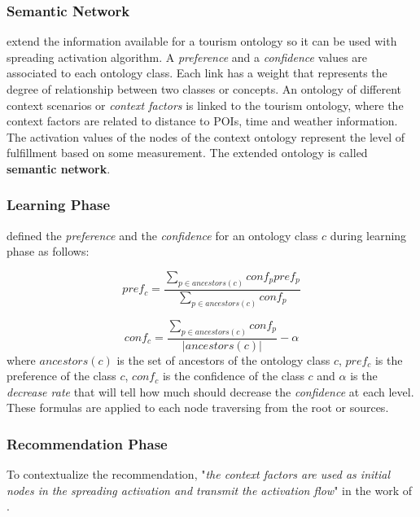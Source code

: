 \documentclass{article}
\begin{document}
\subsubsection{Semantic Network}
\cite{bahramian_abbaspour_claramunt_2017} extend the information available for a tourism ontology so it can be used with spreading activation algorithm. A \textit{preference} and a \textit{confidence} values are associated to each ontology class. Each link has a weight that represents the degree of relationship between two classes or concepts. An ontology of different context scenarios or \textit{context factors} is linked to the tourism ontology, where the context factors are related to distance to POIs, time and weather information. The activation values of the nodes of the context ontology represent the level of fulfillment based on some measurement. The extended ontology is called \textbf{semantic network}.

\subsubsection{Learning Phase}
\cite{bahramian_abbaspour_claramunt_2017} defined the \textit{preference} and the \textit{confidence} for an ontology class $c$ during learning phase as follows:

\begin{equation} \label{eq:preference}
    pref_c = \frac{\displaystyle \sum_{p \in ancestors(c)}{conf_p pref_p}}
                    {\displaystyle  \sum_{p \in ancestors(c)} {conf_p}}
\end{equation}

\begin{equation} \label{eq:confidence}
    conf_c = \frac{\displaystyle \sum_{p \in ancestors(c)} {conf_p}}{|ancestors(c)|} - \alpha
\end{equation}
where $ancestors(c)$ is the set of ancestors of the ontology class $c$, $pref_c$ is the preference of the class $c$, $conf_c$ is the confidence of the class $c$ and $\alpha$ is the \textit{decrease rate} that will tell how much should decrease the \textit{confidence} at each level. These formulas are applied to each node traversing from the root or sources.

\subsubsection{Recommendation Phase}
To contextualize the recommendation, "\textit{the context factors are used as initial nodes in the spreading activation and transmit the activation flow}" in the work of \cite{bahramian_abbaspour_claramunt_2017}.
\end{document}
